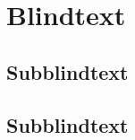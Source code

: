 \section{Blindtext}

\Blindtext

\subsection{Subblindtext}

\blindtext

\subsection{Subblindtext}

\blindtext